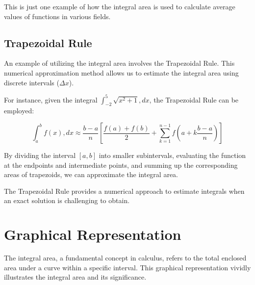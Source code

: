 \documentclass{article}
\begin{document}
This is just one example of how the integral area is used to calculate average values of functions in various fields.
\subsection{Trapezoidal Rule}

An example of utilizing the integral area involves the Trapezoidal Rule. This numerical approximation method allows us to estimate the integral area using discrete intervals ($\Delta x$).

For instance, given the integral $\int_{-2}^5 \sqrt{x^2+1} , dx$, the Trapezoidal Rule can be employed:

\begin{equation}
\int_a^b f(x) , dx \approx \frac{b-a}{n}\left[\frac{f(a)+f(b)}{2}+\sum_{k=1}^{n-1} f\left(a+k \frac{b-a}{n}\right)\right]
\end{equation}

By dividing the interval $[a, b]$ into smaller subintervals, evaluating the function at the endpoints and intermediate points, and summing up the corresponding areas of trapezoids, we can approximate the integral area.

The Trapezoidal Rule provides a numerical approach to estimate integrals when an exact solution is challenging to obtain.
\newpage
\section{Graphical Representation}

The integral area, a fundamental concept in calculus, refers to the total enclosed area under a curve within a specific interval. This graphical representation vividly illustrates the integral area and its significance. 

\begin{center}
\end{center}
\end{document}
